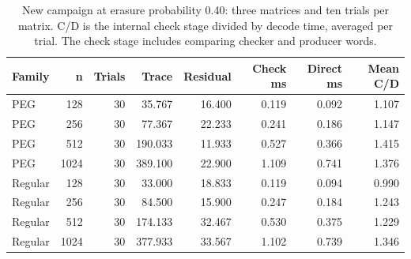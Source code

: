\begin{table}
\centering
\small
\setlength{\tabcolsep}{3pt}
\caption{New campaign at erasure probability 0.40: three matrices and ten trials per matrix. C/D is the internal check stage divided by decode time, averaged per trial. The check stage includes comparing checker and producer words.}
\label{tab:new-experiments}
\begin{tabular}{lrrrrrrr}
\toprule
Family & n & Trials & Trace & Residual & Check ms & Direct ms & Mean C/D \\
\midrule
PEG & 128 & 30 & 35.767 & 16.400 & 0.119 & 0.092 & 1.107 \\
PEG & 256 & 30 & 77.367 & 22.233 & 0.241 & 0.186 & 1.147 \\
PEG & 512 & 30 & 190.033 & 11.933 & 0.527 & 0.366 & 1.415 \\
PEG & 1024 & 30 & 389.100 & 22.900 & 1.109 & 0.741 & 1.376 \\
Regular & 128 & 30 & 33.000 & 18.833 & 0.119 & 0.094 & 0.990 \\
Regular & 256 & 30 & 84.500 & 15.900 & 0.247 & 0.184 & 1.243 \\
Regular & 512 & 30 & 174.133 & 32.467 & 0.530 & 0.375 & 1.229 \\
Regular & 1024 & 30 & 377.933 & 33.567 & 1.102 & 0.739 & 1.346 \\
\bottomrule
\end{tabular}
\end{table}
